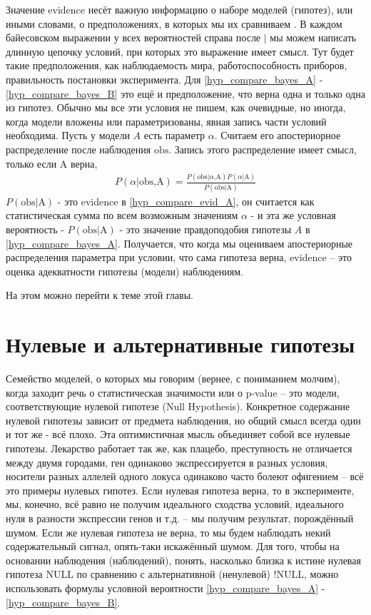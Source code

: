 \documentclass{book}
\begin{document}
 Значение evidence несёт важную информацию о наборе моделей (гипотез), или иными словами, о предположениях, в которых мы их сравниваем \citep[подробнее см.][]{skilling_nested_2006} . В каждом байесовском выражении у всех вероятностей справа после $\text{|}$ мы можем написать длинную цепочку условий, при которых это выражение имеет смысл. Тут будет такие предположения, как наблюдаемость мира, работоспособность приборов, правильность постановки эксперимента. Для \eqref{hyp_compare_bayes_A} - \eqref{hyp_compare_bayes_B} это ещё и предположение, что верна одна и только одна из гипотез. Обычно мы все эти условия не пишем, как очевидные, но иногда, когда модели вложены или параметризованы, явная запись части условий необходима. Пусть у модели $A$ есть параметр $\alpha$. Считаем его апостериорное распределение после наблюдения $\text{obs}$. Запись этого распределение имеет смысл, только если $\text{A}$ верна,
\begin{align}\label{hyp_compare_evid_A}
   P\left(\alpha\text{|obs,A}\right)=\frac{P\left(\text{obs|}\alpha\text{,A}\right) P\left(\alpha\text{|A}\right)}{P\left(\text{obs|A}\right)}
\end{align}
$P\left(\text{obs|A}\right)$ - это evidence в \eqref{hyp_compare_evid_A}, он считается как статистическая сумма по всем возможным значениям $\alpha$ - и эта же условная вероятность - $P\left(\text{obs|A}\right)$ - это значение правдоподобия гипотезы $A$ в \eqref{hyp_compare_bayes_A}. Получается, что когда мы оцениваем апостериорные распределения параметра при условии, что сама гипотеза верна, evidence -- это оценка адекватности гипотезы (модели) наблюдениям. 

На этом можно перейти к теме этой главы.

\section*{Нулевые и альтернативные гипотезы}

Семейство моделей, о которых мы говорим (вернее, с пониманием молчим), когда заходит речь о статистическая значимости или о p-value -- это модели, соответствующие нулевой гипотезе (Null Hypothesis). Конкретное содержание нулевой гипотезы зависит от предмета наблюдения, но общий смысл всегда один и тот же - всё плохо. Эта оптимистичная мысль объединяет собой все нулевые гипотезы. Лекарство работает так же, как плацебо, преступность не отличается между двумя городами, ген одинаково экспрессируется в разных условия, носители разных аллелей одного локуса одинаково часто болеют офигением -- всё это примеры нулевых гипотез. Если нулевая гипотеза верна, то в эксперименте, мы, конечно, всё равно не получим идеального сходства условий, идеального нуля в разности экспрессии генов и т.д. -- мы получим результат, порождённый шумом. Если же нулевая гипотеза не верна, то мы будем наблюдать некий содержательный сигнал, опять-таки искажённый шумом. Для того, чтобы на основании наблюдения (наблюдений), понять, насколько близка к истине нулевая гипотеза $\text{NULL}$ по сравнению с альтернативной (ненулевой) $\text{!NULL}$, можно использовать формулы условной вероятности \eqref{hyp_compare_bayes_A} - \eqref{hyp_compare_bayes_B}. 
\end{document}
